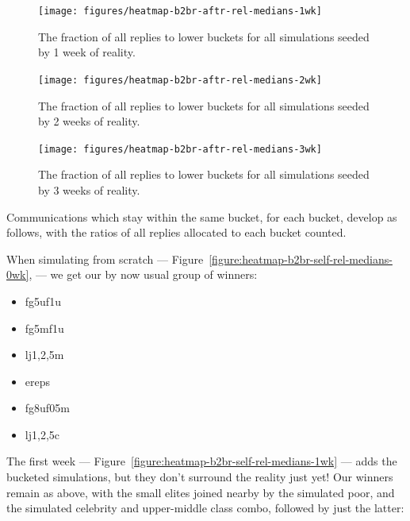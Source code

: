 \documentclass[10pt,oneside]{memoir}
\begin{document}
\begin{Spacing}{2}
\begin{figure}
\begin{center}
    \texttt{[image: figures/heatmap-b2br-aftr-rel-medians-1wk]}
    \caption{The fraction of all replies to lower buckets for all simulations seeded by 1 week of reality.}
    \label{figure:heatmap-b2br-aftr-rel-medians-1wk}
\end{center}
\end{figure}

\begin{figure}
\begin{center}
    \texttt{[image: figures/heatmap-b2br-aftr-rel-medians-2wk]}
    \caption{The fraction of all replies to lower buckets for all simulations seeded by 2 weeks of reality.}
    \label{figure:heatmap-b2br-aftr-rel-medians-2wk}
\end{center}
\end{figure}

\begin{figure}
\begin{center}
    \texttt{[image: figures/heatmap-b2br-aftr-rel-medians-3wk]}
    \caption{The fraction of all replies to lower buckets for all simulations seeded by 3 weeks of reality.}
    \label{figure:heatmap-b2br-aftr-rel-medians-3wk}
\end{center}
\end{figure}
Communications which stay within the same bucket, for each bucket, develop as follows, with the ratios of all replies allocated to each bucket counted.


When simulating from scratch --- Figure~\ref{figure:heatmap-b2br-self-rel-medians-0wk}, --- we get our by now usual group of winners:


\begin{itemize}


\item fg5uf1u

\item fg5mf1u

\item lj{1,2,5}m

\item ereps




\item fg8uf05m




\item lj{1,2,5}c
\end{itemize}

The first week --- Figure~\ref{figure:heatmap-b2br-self-rel-medians-1wk} ---  adds the bucketed simulations, but they don't surround the reality just yet!  Our winners remain as above, with the small elites joined nearby by the simulated poor, and the simulated celebrity and upper-middle class combo, followed by just the latter:



\end{Spacing}
\end{document}

